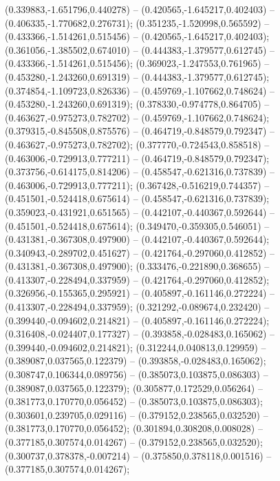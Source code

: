  (0.339883,-1.651796,0.440278) -- (0.420565,-1.645217,0.402403) -- (0.406335,-1.770682,0.276731);
 (0.351235,-1.520998,0.565592) -- (0.433366,-1.514261,0.515456) -- (0.420565,-1.645217,0.402403);
 (0.361056,-1.385502,0.674010) -- (0.444383,-1.379577,0.612745) -- (0.433366,-1.514261,0.515456);
 (0.369023,-1.247553,0.761965) -- (0.453280,-1.243260,0.691319) -- (0.444383,-1.379577,0.612745);
 (0.374854,-1.109723,0.826336) -- (0.459769,-1.107662,0.748624) -- (0.453280,-1.243260,0.691319);
 (0.378330,-0.974778,0.864705) -- (0.463627,-0.975273,0.782702) -- (0.459769,-1.107662,0.748624);
 (0.379315,-0.845508,0.875576) -- (0.464719,-0.848579,0.792347) -- (0.463627,-0.975273,0.782702);
 (0.377770,-0.724543,0.858518) -- (0.463006,-0.729913,0.777211) -- (0.464719,-0.848579,0.792347);
 (0.373756,-0.614175,0.814206) -- (0.458547,-0.621316,0.737839) -- (0.463006,-0.729913,0.777211);
 (0.367428,-0.516219,0.744357) -- (0.451501,-0.524418,0.675614) -- (0.458547,-0.621316,0.737839);
 (0.359023,-0.431921,0.651565) -- (0.442107,-0.440367,0.592644) -- (0.451501,-0.524418,0.675614);
 (0.349470,-0.359305,0.546051) -- (0.431381,-0.367308,0.497900) -- (0.442107,-0.440367,0.592644);
 (0.340943,-0.289702,0.451627) -- (0.421764,-0.297060,0.412852) -- (0.431381,-0.367308,0.497900);
 (0.333476,-0.221890,0.368655) -- (0.413307,-0.228494,0.337959) -- (0.421764,-0.297060,0.412852);
 (0.326956,-0.155365,0.295921) -- (0.405897,-0.161146,0.272224) -- (0.413307,-0.228494,0.337959);
 (0.321292,-0.089674,0.232420) -- (0.399440,-0.094602,0.214821) -- (0.405897,-0.161146,0.272224);
 (0.316408,-0.024407,0.177327) -- (0.393858,-0.028483,0.165062) -- (0.399440,-0.094602,0.214821);
 (0.312244,0.040813,0.129959) -- (0.389087,0.037565,0.122379) -- (0.393858,-0.028483,0.165062);
 (0.308747,0.106344,0.089756) -- (0.385073,0.103875,0.086303) -- (0.389087,0.037565,0.122379);
 (0.305877,0.172529,0.056264) -- (0.381773,0.170770,0.056452) -- (0.385073,0.103875,0.086303);
 (0.303601,0.239705,0.029116) -- (0.379152,0.238565,0.032520) -- (0.381773,0.170770,0.056452);
 (0.301894,0.308208,0.008028) -- (0.377185,0.307574,0.014267) -- (0.379152,0.238565,0.032520);
 (0.300737,0.378378,-0.007214) -- (0.375850,0.378118,0.001516) -- (0.377185,0.307574,0.014267);
